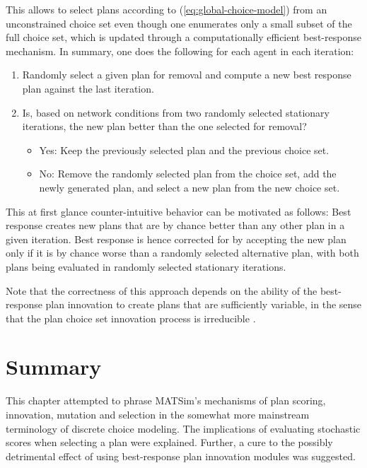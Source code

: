 This allows to select plans according to (\ref{eq:global-choice-model})
from an unconstrained choice set even though one enumerates only a
small subset of the full choice set, which is updated through a computationally
efficient best-response mechanism. In summary, one does the following
for each agent in each iteration:
\begin{enumerate}
\item Randomly select a given plan for removal and compute a new best response
plan against the last iteration.
\item Is, based on network conditions from two randomly selected stationary
iterations, the new plan better than the one selected for removal?

\begin{itemize}
\item Yes: Keep the previously selected plan and the previous choice set.
\item No: Remove the randomly selected plan from the choice set, add the
newly generated plan, and select a new plan from the new choice set.
\end{itemize}
\end{enumerate}
This at first glance counter-intuitive behavior can be motivated as follows: Best response creates new plans that are by chance
better than any other plan in a given iteration. Best response is
hence corrected for by accepting the new plan only if it is by chance
worse than a randomly selected alternative plan, with both plans being
evaluated in randomly selected stationary iterations.

Note that the correctness of this approach depends on the ability
of the best-response plan innovation to create plans that are sufficiently
variable, in the sense that the plan choice set innovation process
is irreducible \citep{ross-2006}.


\section{\label{sec:Summary}Summary}

This chapter attempted to phrase MATSim's mechanisms of plan scoring,
innovation, mutation and selection in the somewhat more mainstream
terminology of discrete choice modeling. The implications of evaluating
stochastic scores when selecting a plan were explained. Further, a
cure to the possibly detrimental effect of using best-response plan
innovation modules was suggested.

